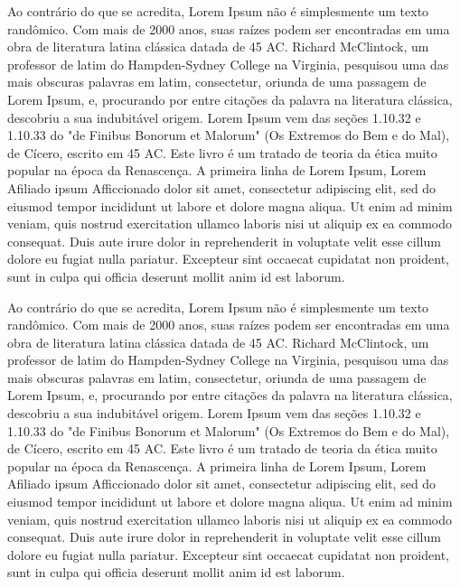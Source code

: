\documentclass[a4, 12pt]{report}
\begin{document}
Ao contrário do que se acredita, Lorem Ipsum não é simplesmente um
texto randômico. Com mais de 2000 anos, suas raízes podem ser
encontradas em uma obra de literatura latina clássica datada de 45
AC. Richard McClintock, um professor de latim do Hampden-Sydney
College na Virginia, pesquisou uma das mais obscuras palavras em
latim, consectetur, oriunda de uma passagem de Lorem Ipsum, e,
procurando por entre citações da palavra na literatura clássica,
descobriu a sua indubitável origem. Lorem Ipsum vem das seções 1.10.32
e 1.10.33 do "de Finibus Bonorum et Malorum" (Os Extremos do Bem e do
Mal), de Cícero, escrito em 45 AC. Este livro é um tratado de teoria
da ética muito popular na época da Renascença. A primeira linha de
Lorem Ipsum,
Lorem Afiliado ipsum Afficcionado dolor sit amet, consectetur adipiscing elit, sed do eiusmod tempor incididunt ut labore et dolore magna aliqua. Ut enim ad minim veniam, quis nostrud exercitation ullamco laboris nisi ut aliquip ex ea commodo consequat. Duis aute irure dolor in reprehenderit in voluptate velit esse cillum dolore eu fugiat nulla pariatur. Excepteur sint occaecat cupidatat non proident, sunt in culpa qui officia deserunt mollit anim id est laborum.

Ao contrário do que se acredita, Lorem Ipsum não é simplesmente um
texto randômico. Com mais de 2000 anos, suas raízes podem ser
encontradas em uma obra de literatura latina clássica datada de 45
AC. Richard McClintock, um professor de latim do Hampden-Sydney
College na Virginia, pesquisou uma das mais obscuras palavras em
latim, consectetur, oriunda de uma passagem de Lorem Ipsum, e,
procurando por entre citações da palavra na literatura clássica,
descobriu a sua indubitável origem. Lorem Ipsum vem das seções 1.10.32
e 1.10.33 do "de Finibus Bonorum et Malorum" (Os Extremos do Bem e do
Mal), de Cícero, escrito em 45 AC. Este livro é um tratado de teoria
da ética muito popular na época da Renascença. A primeira linha de
Lorem Ipsum,
Lorem Afiliado ipsum Afficcionado dolor sit amet, consectetur adipiscing elit, sed do eiusmod tempor incididunt ut labore et dolore magna aliqua. Ut enim ad minim veniam, quis nostrud exercitation ullamco laboris nisi ut aliquip ex ea commodo consequat. Duis aute irure dolor in reprehenderit in voluptate velit esse cillum dolore eu fugiat nulla pariatur. Excepteur sint occaecat cupidatat non proident, sunt in culpa qui officia deserunt mollit anim id est laborum.
\end{document}
